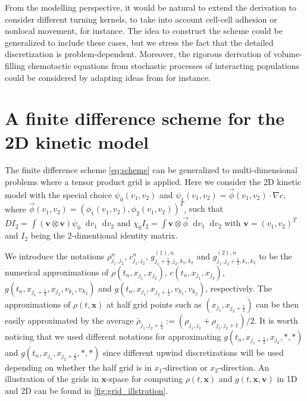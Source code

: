 \documentclass[review,onefignum,onetabnum]{siamart220329}
\newcommand {\bv} { {\mathbf{v}} }
\newcommand*\diff{\mathop{}\!\mathrm{d}}
\begin{document}
{From the modelling perspective, it would be natural to extend the derivation to consider different turning kernels, to take into account cell-cell adhesion or nonlocal movement, for instance. The idea to construct the scheme could be generalized to include these cases, but we stress the fact that the detailed discretization is problem-dependent. %
Moreover, the rigorous derivation of volume-filling chemotactic equations from stochastic processes of interacting populations could be considered by adapting ideas from \cite{stevens2000derivation} for instance. 
}


\appendix


\section{A finite difference scheme for the 2D kinetic model} \label{sec:appendix-FD-2D}
The finite difference scheme \cref{eq:scheme} can be generalized to multi-dimensional problems where a tensor product grid is applied. 
Here we consider the 2D kinetic model with the special choice $\psi_0(v_1,v_2)$ and $\psi_1(v_1, v_2) = \vec{\phi}(v_1,v_2) \cdot \nabla c$, where $\vec{\phi}(v_1,v_2) = (\phi_1(v_1,v_2), \phi_2(v_1,v_2))^T $, 
{ such that 
$D I_2 = \int (\bv\otimes \bv) \psi_0 \diff v_1 \diff v_2$ 
and
$\chi_0 I_2 = \int \bv\otimes \vec{\phi} \diff v_1 \diff v_2$ with $\bv=(v_1, v_2)^T$ and $I_2$ being the 2-dimentional identity matrix. 
}

We introduce the notations  $\rho_{j_1,j_2}^n$, $c_{j_1,j_2}^n$,  $g_{j_1+\frac12,j_2,k_1,k_2}^{(1), n}$ and $g_{j_1,j_2+\frac12,k_1,k_2}^{(2), n}$ to be the numerical approximations of $\rho(t_n,x_{j_1}, x_{j_2})$, $c(t_n,x_{j_1}, x_{j_2})$, $g(t_n, x_{j_1+\frac12}, x_{j_2}, v_{k_1}, v_{k_2})$ and 
$g(t_n, x_{j_1}, x_{j_2+\frac12}, v_{k_1}, v_{k_2})$, respectively. 
The approximations of $\rho(t, \mathbf{x})$ at half grid points such as $(x_{j_1}, x_{j_2+\frac12})$ can be then easily approximated by the average $\bar{\rho}_{j_1, j_2+\frac12} := (\rho_{j_1, j_2} + \rho_{j_1, j_2+1})/2$. 
It is worth noticing that we used different notations for approximating $g(t_n, x_{j_1+\frac12}, x_{j_2}, *, *)$ and $g(t_n, x_{j_1}, x_{j_2+\frac12}, *, *)$ since different upwind discretizations will be used depending on whether the half grid is in $x_1$-direction or $x_2$-direction. 
An illustration of the grids in $\mathbf{x}$-space for computing $\rho(t,\mathbf{x})$ and $g(t,\mathbf{x},\mathbf{v})$ in 1D and 2D can be found in \cref{fig:grid_illstration}. 
\end{document}
